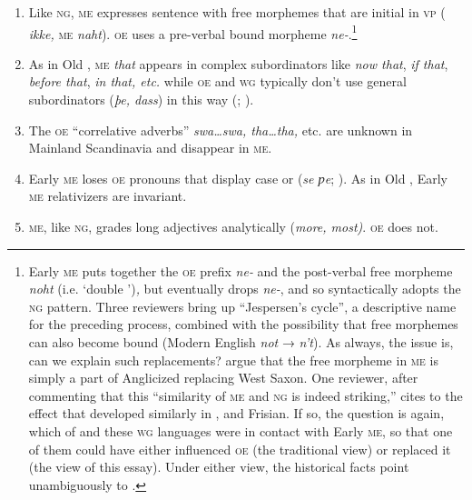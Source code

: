 \documentclass[output=paper]{LSP/langsci}
\begin{document}
\begin{enumerate}[label={(\alph*)}]
\item Like \textsc{ng}, \textsc{me} expresses sentence  with free morphemes that are initial in \textsc{vp} ( \textit{ikke,} \textsc{me} \textit{naht}). \textsc{oe} uses a pre-verbal bound morpheme \textit{ne-}.\footnote{Early \textsc{me} puts together the \textsc{oe} prefix \textit{ne-} and the post-verbal free morpheme \textit{noht} (i.e. ‘double ’)\textit{,} but eventually drops \textit{ne-}, and so syntactically adopts the \textsc{ng} pattern. Three reviewers bring up ``Jespersen’s cycle'', a descriptive name for the preceding process, combined with the possibility that free  morphemes can also become bound (Modern English \textit{not} → \textit{n’t}). As always, the issue is, can we explain such replacements? \citet[Sect. 7.2.6]{EmondsFaarlund2014} argue that the free morpheme in \textsc{me} is simply a part of Anglicized  replacing West Saxon. One reviewer, after commenting that this ``similarity of \textsc{me} and \textsc{ng} is indeed striking,'' cites \citet{Breitbarth2009} to the effect that  developed similarly in ,  and Frisian. If so, the {question} is again, which of  and these \textsc{wg} languages were in contact with Early \textsc{me}, so that one of them could have either influenced \textsc{oe} (the traditional view) or replaced it (the view of this essay). Under either view, the historical facts point unambiguously to .}
\item \begin{stylerootsmmxivArticleText}
As in Old , \textsc{me} \textit{that} appears in complex subordinators like \textit{now that},\textit{ if that},\textit{ before that}, \textit{in that, etc.} while \textsc{oe} and \textsc{wg} typically don’t use general subordinators (\textit{þe, dass}) in this way (\citealt[143--144]{EmondsFaarlund2014}; \citealt[ 295]{Fischer1992}). 
\end{stylerootsmmxivArticleText}\item The \textsc{oe} “correlative adverbs” \textit{swa…swa, tha…tha,} etc. are unknown in Mainland Scandinavia and disappear in \textsc{me}.
\item Early \textsc{me} loses \textsc{oe}  pronouns that display case or  (\textit{se ƿe};  \citealt{Mitchell1992}). As in Old , Early \textsc{me} relativizers are invariant. 
\item \textsc{me}, like \textsc{ng}, grades long adjectives analytically (\textit{more, most)}. \textsc{oe} does not.

\end{enumerate}
\end{document}
